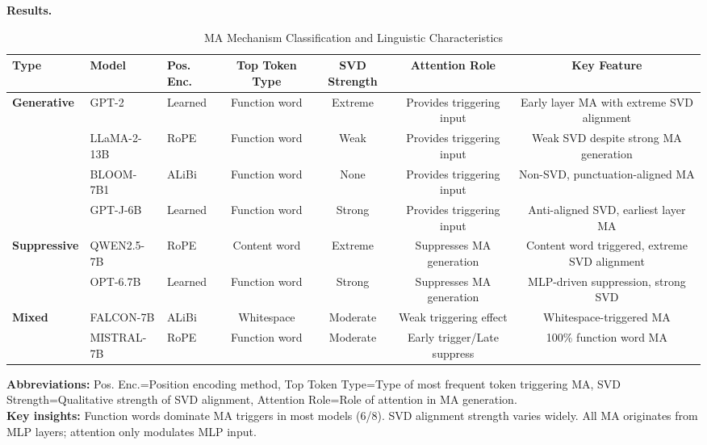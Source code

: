 \documentclass[conference]{IEEEtran}
\begin{document}
\smallskip
\noindent\textbf{Results.}

\begin{table}[htbp]
\centering
\caption{MA Mechanism Classification and Linguistic Characteristics}
\label{tab:ma_mechanism_linguistic}
\footnotesize
\begin{tabular}{@{}lllcccc@{}}
\toprule
\textbf{Type} & \textbf{Model} & \textbf{Pos. Enc.} & \textbf{Top Token Type} & \textbf{SVD Strength} & \textbf{Attention Role} & \textbf{Key Feature} \\
\midrule
\multirow{4}{*}{\textbf{Generative}} 
& GPT-2 & Learned & Function word & Extreme & Provides triggering input & Early layer MA with extreme SVD alignment \\
& LLaMA-2-13B & RoPE & Function word & Weak & Provides triggering input & Weak SVD despite strong MA generation \\
& BLOOM-7B1 & ALiBi & Function word & None & Provides triggering input & Non-SVD, punctuation-aligned MA \\
& GPT-J-6B & Learned & Function word & Strong & Provides triggering input & Anti-aligned SVD, earliest layer MA \\
\midrule
\multirow{2}{*}{\textbf{Suppressive}}
& QWEN2.5-7B & RoPE & Content word & Extreme & Suppresses MA generation & Content word triggered, extreme SVD alignment \\
& OPT-6.7B & Learned & Function word & Strong & Suppresses MA generation & MLP-driven suppression, strong SVD \\
\midrule
\multirow{2}{*}{\textbf{Mixed}}
& FALCON-7B & ALiBi & Whitespace & Moderate & Weak triggering effect & Whitespace-triggered MA \\
& MISTRAL-7B & RoPE & Function word & Moderate & Early trigger/Late suppress & 100\% function word MA \\
\bottomrule
\end{tabular}

\vspace{2mm}
\parbox{\linewidth}{\scriptsize
\textbf{Abbreviations:} Pos. Enc.=Position encoding method, Top Token Type=Type of most frequent token triggering MA, SVD Strength=Qualitative strength of SVD alignment, Attention Role=Role of attention in MA generation. \\
\textbf{Key insights:} Function words dominate MA triggers in most models (6/8). SVD alignment strength varies widely. All MA originates from MLP layers; attention only modulates MLP input.}
\end{table}
\end{document}
